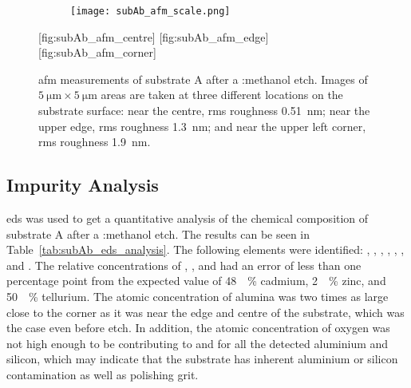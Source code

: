 \begin{figure}[htbp]
    \centering
    \begin{subfigure}[c]{0.032\linewidth}
        \label{fig:subAb_afm_scale}\captionsetup{list=no}
        \texttt{[image: subAb\_afm\_scale.png]}
    \end{subfigure}
    \hfill
    [fig:subAb_afm_centre] %
    \hfill
    [fig:subAb_afm_edge] %
    \hfill
    [fig:subAb_afm_corner]%
    \caption[\Ac{afm} of substrate A after a :methanol etch.]{\Ac{afm} measurements of substrate A after a :methanol etch. Images of $\SI{5}{\micro\metre}\times\SI{5}{\micro\metre}$ areas are taken at three different locations on the substrate surface:  near the centre, \ac{rms} roughness \SI{0.51}{\nano\metre};  near the upper edge, \ac{rms} roughness \SI{1.3}{\nano\metre}; and  near the upper left corner, \ac{rms} roughness \SI{1.9}{\nano\metre}.}\label{fig:subAb_afm}
\end{figure} %

\subsection{Impurity Analysis}
\Ac{eds} was used to get a quantitative analysis of the chemical composition of substrate A after a :methanol etch. The results can be seen in Table~\ref{tab:subAb_eds_analysis}. The following elements were identified: , , , , , , and . The relative concentrations of , , and  had an error of less than one percentage point from the expected value of \SI{48}{\atomic\percent} cadmium, \SI{2}{\atomic\percent} zinc, and \SI{50}{\atomic\percent} tellurium. The atomic concentration of alumina was two times as large close to the corner as it was near the edge and centre of the substrate, which was the case even before etch. In addition, the atomic concentration of oxygen was not high enough to be contributing to  and  for all the detected aluminium and silicon, which may indicate that the substrate has inherent aluminium or silicon contamination as well as polishing grit.

